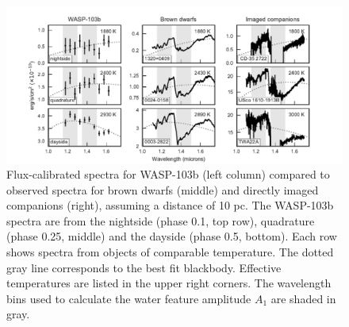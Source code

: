 \documentclass[twocolumn, trackchanges]{aastex61}
\begin{document}
\begin{figure}
\includegraphics[width = 1.0\textwidth]{fig17.pdf}
\caption{Flux-calibrated spectra for WASP-103b (left column) compared to
observed spectra for brown dwarfs (middle) and directly imaged companions
(right), assuming a distance of 10 pc. The WASP-103b spectra are from the
nightside (phase 0.1, top row), quadrature (phase 0.25, middle) and the dayside
(phase 0.5, bottom). Each row shows spectra from objects of comparable
temperature. The dotted gray line corresponds to the best fit blackbody.
Effective temperatures are listed in the upper right corners. The wavelength
bins used to calculate the water feature amplitude $A_1$ are shaded in gray.
}
\label{fig:planetstarcomparison}
\end{figure}
\end{document}
